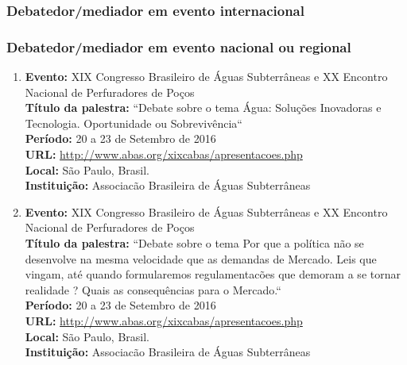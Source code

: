 \documentclass[a4paper,oneside,10pt]{article}
\begin{document}
\subsubsection{Debatedor/mediador em evento internacional}
\vspace{0.3cm}

\subsubsection{Debatedor/mediador em evento nacional ou regional}
\vspace{0.3cm}

\begin{enumerate}
\item   \textbf{Evento:} XIX Congresso Brasileiro de Águas Subterrâneas e XX Encontro Nacional de Perfuradores de Poços
  \mbox{} \\
        \textbf{Título da palestra:} ``Debate sobre o tema Água: Soluções Inovadoras e Tecnologia. Oportunidade ou Sobrevivência``\\
        \textbf{Período:} 20 a 23 de Setembro de 2016\\
        \textbf{URL:} \url{http://www.abas.org/xixcabas/apresentacoes.php}\\
        \textbf{Local:} São Paulo, Brasil.\\
         \textbf{Instituição:} Associacão Brasileira de Águas Subterrâneas\\

\item   \textbf{Evento:} XIX Congresso Brasileiro de Águas Subterrâneas e XX Encontro Nacional de Perfuradores de Poços
  \mbox{} \\
        \textbf{Título da palestra:} ``Debate sobre o tema Por que a política não se desenvolve na mesma velocidade que as demandas de Mercado. Leis que vingam, até quando formularemos regulamentacões que demoram a se tornar realidade ? Quais as consequências para o Mercado.``\\
        \textbf{Período:} 20 a 23 de Setembro de 2016\\
        \textbf{URL:} \url{http://www.abas.org/xixcabas/apresentacoes.php}\\
        \textbf{Local:} São Paulo, Brasil.\\
         \textbf{Instituição:} Associacão Brasileira de Águas Subterrâneas\\       


\end{enumerate}
\end{document}
